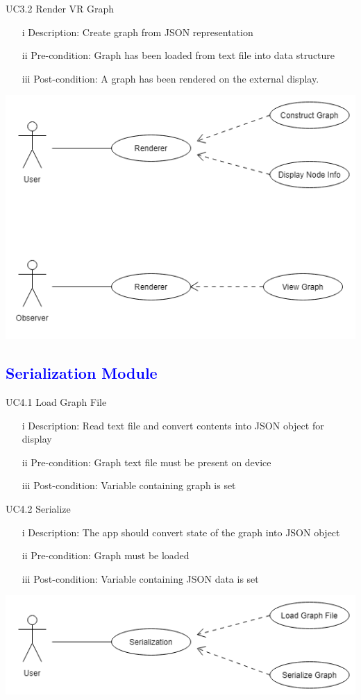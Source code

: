 \documentclass[12pt]{article}
\begin{document}
\bigskip

\begin{flushleft}
UC3.2 Render VR Graph
\begin{itemize}
\item[i]Description: Create graph from JSON representation
\item[ii] Pre-condition: Graph has been loaded from text file into data structure
\item[iii] Post-condition: A graph has been rendered on the external display.
\end{itemize}
\end{flushleft}

\includegraphics[scale=0.5]{Dps/Renderer}

\textcolor{blue}{\subsection{Serialization Module}}
\begin{flushleft}
UC4.1 Load Graph File
\begin{itemize}
\item[i] Description: Read text file and convert contents into JSON object for display
\item[ii] Pre-condition: Graph text file must be present on device
\item[iii] Post-condition: Variable containing graph is set
\end{itemize}
\end{flushleft}

\begin{flushleft}
UC4.2 Serialize
\begin{itemize}
\item[i]Description: The app should convert state of the graph into JSON object
\item[ii] Pre-condition: Graph must be loaded
\item[iii] Post-condition: Variable containing JSON data is set
\end{itemize}
\end{flushleft}

\includegraphics[scale=0.5]{Dps/Serialization}
\end{document}
